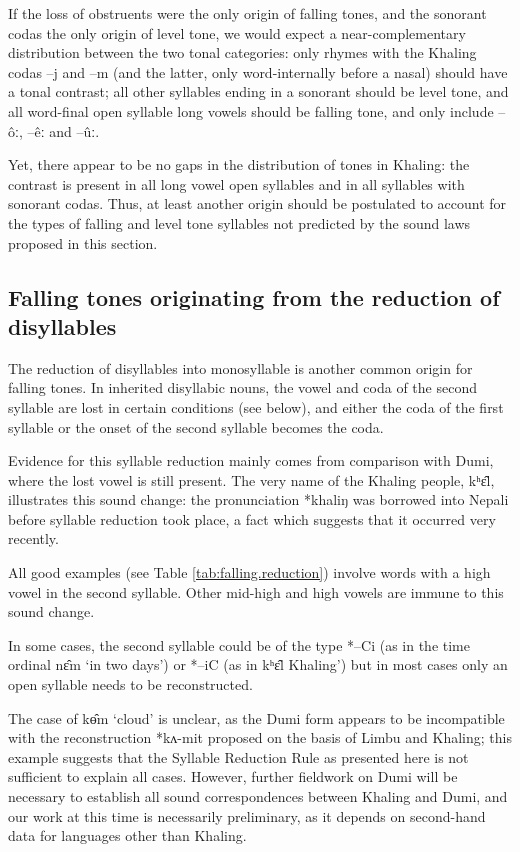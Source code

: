 \documentclass[oldfontcommands,oneside,a4paper,11pt]{article}
\newcommand{\ipa}[1]{{\phon \mbox{#1}}} %
\begin{document}
If the loss of obstruents were the only origin of falling tones, and the sonorant codas the only origin of level tone, we would expect a near-complementary distribution between the two tonal categories: only rhymes with the Khaling codas \ipa{--j} and \ipa{--m} (and the latter, only word-internally before a nasal) should have a tonal contrast; all other syllables ending in a sonorant should be level tone, and all word-final open syllable long vowels should be falling tone, and only include \ipa{--ôː}, \ipa{--êː} and \ipa{--ûː}.

Yet, there appear to be no gaps in the distribution of tones in Khaling: the contrast is present in all long vowel open syllables and in all syllables with sonorant codas. Thus, at least another origin should be postulated to account for the types of falling and level tone syllables not predicted by the sound laws proposed in this section.

\subsection{Falling tones originating from the reduction of disyllables} \label{sec:disyll}
The reduction of disyllables into monosyllable is another common origin for falling tones. In inherited disyllabic nouns, the vowel and coda of the second syllable are   lost in certain conditions (see below), and either the coda of the first syllable or the onset of the second syllable becomes the coda.

Evidence for this syllable reduction mainly comes from comparison with Dumi, where the lost vowel is still present. The very name of the Khaling people, \ipa{kʰɛ‍̂l}, illustrates this sound change: the pronunciation \ipa{*khaliŋ}		was borrowed into Nepali before syllable reduction took place, a fact which suggests that it occurred very recently.


All good examples (see Table \ref{tab:falling.reduction}) involve words with a high vowel in the second syllable. Other mid-high and high vowels are immune to this sound change.

In some cases, the second syllable could be of the type *--Ci (as in the time ordinal \ipa{nɛ̂m}  `in two days') or *--iC (as in \ipa{kʰɛ‍̂l}  Khaling') but in most cases only an open syllable  needs to be reconstructed.

The case of \ipa{kɵ̂m}	`cloud' is unclear, as the Dumi form appears to be incompatible with the reconstruction \ipa{*kʌ-mit} proposed on the basis of Limbu and Khaling; this example suggests that the Syllable Reduction Rule as presented here is not sufficient to explain all cases. However, further fieldwork on Dumi will be necessary to establish all sound  correspondences between Khaling and Dumi, and our work at this time is necessarily preliminary, as it depends on second-hand data for languages other than Khaling.
\end{document}
